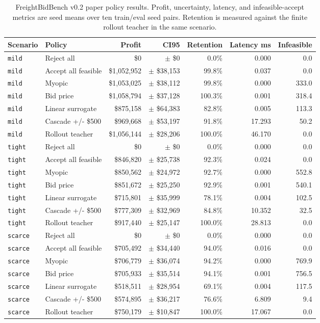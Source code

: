 \documentclass[11pt]{article}
\begin{document}
\begin{table}[t]
\centering
\caption{FreightBidBench v0.2 paper policy results. Profit, uncertainty,
latency, and infeasible-accept metrics are seed means over ten train/eval seed
pairs. Retention is measured against the finite rollout teacher in the same
scenario.}
\scriptsize
\begin{tabular}{@{}llrrrrr@{}}
\toprule
Scenario & Policy & Profit & CI95 & Retention & Latency ms & Infeasible \\
\midrule
\texttt{mild} & Reject all & \$0 & $\pm$ \$0 & 0.0\% & 0.000 & 0.0 \\
\texttt{mild} & Accept all feasible & \$1,052,952 & $\pm$ \$38,153 & 99.8\% & 0.037 & 0.0 \\
\texttt{mild} & Myopic & \$1,053,025 & $\pm$ \$38,112 & 99.8\% & 0.000 & 333.0 \\
\texttt{mild} & Bid price & \$1,058,794 & $\pm$ \$37,128 & 100.3\% & 0.001 & 318.4 \\
\texttt{mild} & Linear surrogate & \$875,158 & $\pm$ \$64,383 & 82.8\% & 0.005 & 113.3 \\
\texttt{mild} & Cascade +/- \$500 & \$969,668 & $\pm$ \$53,197 & 91.8\% & 17.293 & 50.2 \\
\texttt{mild} & Rollout teacher & \$1,056,144 & $\pm$ \$28,206 & 100.0\% & 46.170 & 0.0 \\
\texttt{tight} & Reject all & \$0 & $\pm$ \$0 & 0.0\% & 0.000 & 0.0 \\
\texttt{tight} & Accept all feasible & \$846,820 & $\pm$ \$25,738 & 92.3\% & 0.024 & 0.0 \\
\texttt{tight} & Myopic & \$850,562 & $\pm$ \$24,972 & 92.7\% & 0.000 & 552.8 \\
\texttt{tight} & Bid price & \$851,672 & $\pm$ \$25,250 & 92.9\% & 0.001 & 540.1 \\
\texttt{tight} & Linear surrogate & \$715,801 & $\pm$ \$35,999 & 78.1\% & 0.004 & 102.5 \\
\texttt{tight} & Cascade +/- \$500 & \$777,309 & $\pm$ \$32,969 & 84.8\% & 10.352 & 32.5 \\
\texttt{tight} & Rollout teacher & \$917,440 & $\pm$ \$25,147 & 100.0\% & 28.813 & 0.0 \\
\texttt{scarce} & Reject all & \$0 & $\pm$ \$0 & 0.0\% & 0.000 & 0.0 \\
\texttt{scarce} & Accept all feasible & \$705,492 & $\pm$ \$34,440 & 94.0\% & 0.016 & 0.0 \\
\texttt{scarce} & Myopic & \$706,779 & $\pm$ \$36,074 & 94.2\% & 0.000 & 769.9 \\
\texttt{scarce} & Bid price & \$705,933 & $\pm$ \$35,514 & 94.1\% & 0.001 & 756.5 \\
\texttt{scarce} & Linear surrogate & \$518,511 & $\pm$ \$28,954 & 69.1\% & 0.004 & 117.5 \\
\texttt{scarce} & Cascade +/- \$500 & \$574,895 & $\pm$ \$36,217 & 76.6\% & 6.809 & 9.4 \\
\texttt{scarce} & Rollout teacher & \$750,179 & $\pm$ \$10,847 & 100.0\% & 17.067 & 0.0 \\
\bottomrule
\end{tabular}
\label{tab:results}
\end{table}
\end{document}
